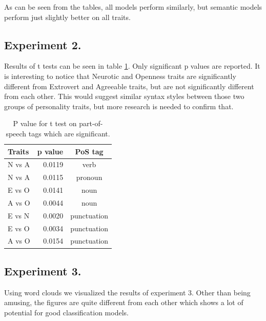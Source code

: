 \documentclass[10pt, a4paper]{article}
\begin{document}
As can be seen from the tables, all models perform similarly, but semantic models perform just slightly better on all traits.

\subsection{Experiment 2.}

Results of t tests can be seen in table \ref{table:ttest}.
Only significant p values are reported.
It is interesting to notice that Neurotic and Openness traits are significantly different from Extrovert and Agreeable traits, but are not significantly different from each other.
This would suggest similar syntax styles between those two groups of personality traits, but more research is needed to confirm that.

\begin{table}[H]
  \centering
  \caption{P value for t test on part-of-speech tags which are significant.}
  \begin{tabular}{lrc}
    \toprule
    Traits & p value & PoS tag \\
    \midrule
    N vs A & 0.0119 & verb \\
    N vs A & 0.0115 & pronoun \\
    E vs O & 0.0141 & noun \\
    A vs O & 0.0044 & noun \\
    E vs N & 0.0020 & punctuation \\
    E vs O & 0.0034 & punctuation \\
    A vs O & 0.0154 & punctuation \\
    \bottomrule
  \end{tabular}
  \label{table:ttest}
\end{table}

\subsection{Experiment 3.}

Using word clouds we visualized the results of experiment 3.
Other than being amusing, the figures are quite different from each other which shows a lot of potential for good classification models.
\end{document}
